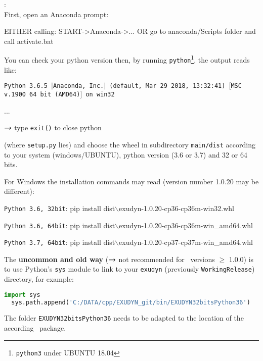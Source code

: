 :\vspace{6pt}\\
First, open an Anaconda prompt:
\bi
  \item EITHER calling: START->Anaconda->... OR go to anaconda/Scripts folder and call activate.bat
	\item You can check your python version then, by running \texttt{python}\footnote{\texttt{python3} under UBUNTU 18.04}, the output reads like:
	\bi
	  \item[] \texttt{Python 3.6.5 $|$Anaconda, Inc.$|$ (default, Mar 29 2018, 13:32:41) $[$MSC v.1900 64 bit (AMD64)$]$ on win32}
		\item[] ...
	\ei
	\item $\rightarrow$ type \texttt{exit()} to close python
\ei

 (where \texttt{setup.py} lies) and choose the wheel in subdirectory \texttt{main/dist} according to your system (windows/UBUNTU), python version (3.6 or 3.7) and 32 or 64 bits.

For Windows the installation commands may read (version number 1.0.20 may be different):
\bi
  \item \texttt{Python 3.6, 32bit}: pip install dist$\backslash$exudyn-1.0.20-cp36-cp36m-win32.whl
  \item \texttt{Python 3.6, 64bit}: pip install dist$\backslash$exudyn-1.0.20-cp36-cp36m-win\_amd64.whl
  \item \texttt{Python 3.7, 64bit}: pip install dist$\backslash$exudyn-1.0.20-cp37-cp37m-win\_amd64.whl
\ei

The {\bf uncommon and old way} ($\rightarrow$ not recommended for \codeName\ versions $\ge$ 1.0.0) is to use Python's \texttt{sys} module to link to your \texttt{exudyn} (previously \texttt{WorkingRelease}) directory, for example:\vspace{6pt}\\
\pythonstyle
\begin{lstlisting}[language=Python, firstnumber=1]
  import sys
  sys.path.append('C:/DATA/cpp/EXUDYN_git/bin/EXUDYN32bitsPython36')
\end{lstlisting}
%
The folder \texttt{EXUDYN32bitsPython36} needs to be adapted to the location of the according \codeName\ package.

